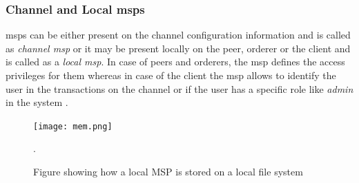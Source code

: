 \documentclass[
  a4paper,  %
  twoside,  %
  bibliography=totoc,
  headsepline,
  cleardoublepage=empty,
  parskip=half,
  draft=false
]{scrbook}
\begin{document}
\subsubsection{Channel and Local \glspl{msp}}
\glspl{msp} can be either present on the channel configuration information and is called as \textit{channel \gls{msp}} or it may be present locally on the peer, orderer or the client and is called as a \textit{local \gls{msp}}. In case of peers and orderers, the \gls{msp} defines the access privileges for them whereas in case of the client the \gls{msp} allows to identify the user in the transactions on the channel or if the user has a specific role like \textit{admin} in the system \cite{Membership}. 

\begin{figure}[t!]
\begin{center}
\texttt{[image: mem.png]}
\caption{Figure showing how a local MSP is stored on a local file system \cite{Membership}}.
\label{fig:mem}
\end{center}
\end{figure}
\end{document}
